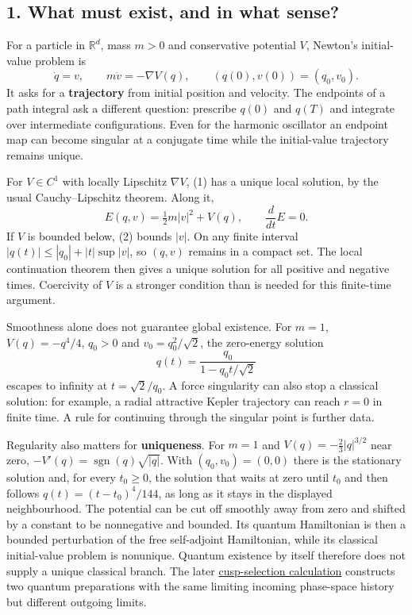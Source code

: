 \documentclass[11pt,a4paper]{article}
\begin{document}
\hypertarget{what-must-exist-and-in-what-sense}{%
\subsection{1. What must exist, and in what
sense?}\label{what-must-exist-and-in-what-sense}}

For a particle in \(\mathbb R^d\), mass \(m>0\) and conservative
potential \(V\), Newton's initial-value problem is \[
 \dot q=v,\qquad m\dot v=-\nabla V(q),\qquad
 (q(0),v(0))=(q_0,v_0). \tag{1}
\] It asks for a \textbf{trajectory} from initial position and velocity.
The endpoints of a path integral ask a different question: prescribe
\(q(0)\) and \(q(T)\) and integrate over intermediate configurations.
Even for the harmonic oscillator an endpoint map can become singular at
a conjugate time while the initial-value trajectory remains unique.

For \(V\in C^1\) with locally Lipschitz \(\nabla V\), (1) has a unique
local solution, by the usual Cauchy--Lipschitz theorem. Along it,
\[E(q,v)=\tfrac12m|v|^2+V(q),\qquad \frac d{dt}E=0.\tag{2}\] If \(V\) is
bounded below, (2) bounds \(|v|\). On any finite interval
\(|q(t)|\le |q_0|+|t|\sup|v|\), so \((q,v)\) remains in a compact set.
The local continuation theorem then gives a unique solution for all
positive and negative times. Coercivity of \(V\) is a stronger condition
than is needed for this finite-time argument.

Smoothness alone does not guarantee global existence. For \(m=1\),
\(V(q)=-q^4/4\), \(q_0>0\) and \(v_0=q_0^2/\sqrt2\), the zero-energy
solution \[q(t)=\frac{q_0}{1-q_0t/\sqrt2}\tag{3}\] escapes to infinity
at \(t=\sqrt2/q_0\). A force singularity can also stop a classical
solution: for example, a radial attractive Kepler trajectory can reach
\(r=0\) in finite time. A rule for continuing through the singular point
is further data.

Regularity also matters for \textbf{uniqueness}. For \(m=1\) and
\(V(q)=-\frac23|q|^{3/2}\) near zero,
\(-V'(q)=\operatorname{sgn}(q)\sqrt{|q|}\). With \((q_0,v_0)=(0,0)\)
there is the stationary solution and, for every \(t_0\ge0\), the
solution that waits at zero until \(t_0\) and then follows
\(q(t)=(t-t_0)^4/144\), as long as it stays in the displayed
neighbourhood. The potential can be cut off smoothly away from zero and
shifted by a constant to be nonnegative and bounded. Its quantum
Hamiltonian is then a bounded perturbation of the free self-adjoint
Hamiltonian, while its classical initial-value problem is nonunique.
Quantum existence by itself therefore does not supply a unique classical
branch. The later
\href{cusp-quantum-preparation-selection.md}{cusp-selection calculation}
constructs two quantum preparations with the same limiting incoming
phase-space history but different outgoing limits.
\end{document}
